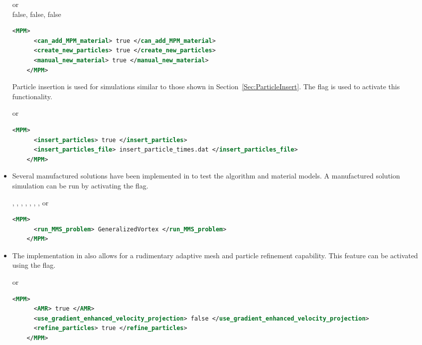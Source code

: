 \begin{itemize}
      or \\
     false, false, false
    \begin{lstlisting}[language=XML]
    <MPM>
      <can_add_MPM_material> true </can_add_MPM_material>
      <create_new_particles> true </create_new_particles>
      <manual_new_material> true </manual_new_material>
    </MPM>
    \end{lstlisting}

    Particle insertion is used for simulations similar to those shown in 
    Section~\ref{Sec:ParticleInsert}. The flag \newline{} is
    used to activate this functionality.

      or \\
      
    \begin{lstlisting}[language=XML]
    <MPM>
      <insert_particles> true </insert_particles>
      <insert_particles_file> insert_particle_times.dat </insert_particles_file>
    </MPM>
    \end{lstlisting}
    
  \item {} Several manufactured solutions
    have been implemented in \Vaango to test the \MPM algorithm and material
    models. A manufactured solution simulation can be run by activating 
    the  flag.

     , , 
                       , ,
                       , ,
                       , or
                       \\
     
    \begin{lstlisting}[language=XML]
    <MPM>
      <run_MMS_problem> GeneralizedVortex </run_MMS_problem>
    </MPM>
    \end{lstlisting}

  \item {} The \MPM implementation in 
    \Vaango also allows for a rudimentary adaptive mesh and particle refinement
    capability.  This feature can be activated using the  flag.

      or 
     
    \begin{lstlisting}[language=XML]
    <MPM>
      <AMR> true </AMR>
      <use_gradient_enhanced_velocity_projection> false </use_gradient_enhanced_velocity_projection>
      <refine_particles> true </refine_particles>
    </MPM>
    \end{lstlisting}
\end{itemize}

